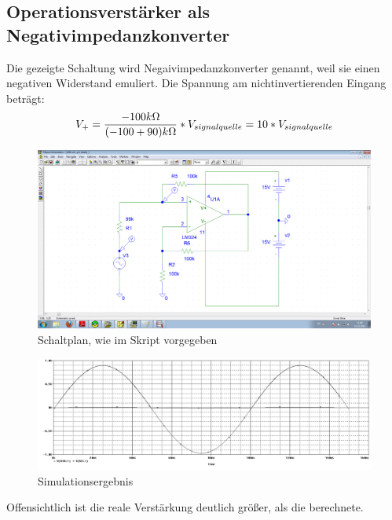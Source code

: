 \subsection{Operationsverstärker als Negativimpedanzkonverter}
Die gezeigte Schaltung wird Negaivimpedanzkonverter genannt, weil sie einen negativen Widerstand emuliert.
Die Spannung am nichtinvertierenden Eingang beträgt:
\[ V_+ = \frac{-100k\Omega}{(-100+90)k\Omega} * V_{signalquelle} = 10 * V_{signalquelle} \]
\begin{figure}[H]
	\centering
	\includegraphics[width=\linewidth]{versuch6/spice/schem645.png}
	\caption{Schaltplan, wie im Skript vorgegeben}
\end{figure}
\begin{figure}[H]
	\centering
	\includegraphics[width=\linewidth]{versuch6/spice/645.png}
	\caption{Simulationsergebnis}
\end{figure}
Offensichtlich ist die reale Verstärkung deutlich größer, als die berechnete.





